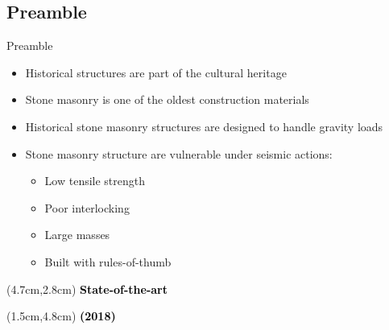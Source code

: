\documentclass{EESD}
\begin{document}
\subsection{Preamble}
\begin{frame}[t]{Preamble}\vspace{4pt}
\begin{itemize}
    \item Historical structures are part of the cultural heritage\vspace{10pt}\pause
    \item Stone masonry is one of the oldest construction materials\vspace{10pt}\pause
    \item Historical stone masonry structures are designed to handle gravity loads\vspace{10pt}\pause
    \item Stone masonry structure are vulnerable under seismic actions:\vspace{5pt}
    \begin{itemize}
        \item Low tensile strength
        \item Poor interlocking
        \item Large masses
        \item Built with rules-of-thumb
    \end{itemize}
\end{itemize}
\end{frame}


\begin{frame}[t]{}
\begin{textblock*}{10cm}(4.7cm,2.8cm)
\Huge\textbf{\textcolor{black}{State-of-the-art}}
\end{textblock*}
\begin{textblock*}{10cm}(1.5cm,4.8cm)
\small\textbf{\textcolor{black}{{\cite{REF:5} (2018)}
}}
\end{textblock*}
\end{frame}
\usebackgroundtemplate{}
\end{document}
